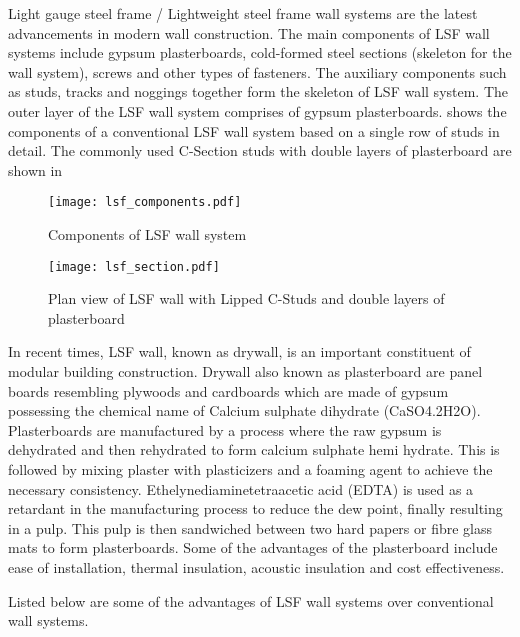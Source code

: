 Light gauge steel frame / Lightweight steel frame wall systems are the latest advancements in modern wall construction. The main components of LSF wall systems include gypsum plasterboards, cold-formed steel sections (skeleton for the wall system), screws and other types of fasteners. The auxiliary components such as studs, tracks and noggings together form the skeleton of LSF wall system. The outer layer of the LSF wall system comprises of gypsum plasterboards.  shows the components of a conventional LSF wall system based on a single row of studs in detail. The commonly used C-Section studs with double layers of plasterboard are shown in 
\begin{figure}[htbp]
	\centering	
			\texttt{[image: lsf\_components.pdf]}
				\caption{Components of LSF wall system}
		\label{fig:lsf_components}
\end{figure}
\begin{figure}[htbp]
	\centering	
		\texttt{[image: lsf\_section.pdf]}
		\caption{Plan view of LSF wall with Lipped C-Studs and double layers of plasterboard}
		\label{fig:lsf_section}
\end{figure}

In recent times, LSF wall, known as drywall, is an important constituent of modular building construction. Drywall also known as plasterboard are panel boards resembling plywoods and cardboards which are made of gypsum possessing the chemical name of Calcium sulphate dihydrate (CaSO4.2H2O). Plasterboards are manufactured by a process where the raw gypsum is dehydrated and then rehydrated to form calcium sulphate hemi hydrate. This is followed by mixing plaster with plasticizers and a foaming agent to achieve the necessary consistency. Ethelynediaminetetraacetic acid (EDTA) is used as a retardant in the manufacturing process to reduce the dew point, finally resulting in a pulp. This pulp is then sandwiched between two hard papers or fibre glass mats to form plasterboards. Some of the advantages of the plasterboard include ease of installation, thermal insulation, acoustic insulation and cost effectiveness.

Listed below are some of the advantages of LSF wall systems over conventional wall systems.

